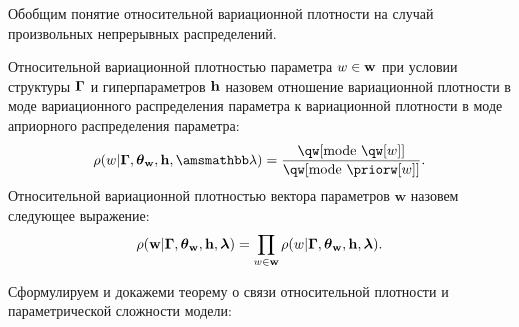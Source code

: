 Обобщим понятие относительной вариационной плотности на случай произвольных непрерывных распределений.
\begin{defin}
Относительной вариационной   плотностью параметра $w \in \mathbf{w}$  при условии структуры $\boldsymbol{\Gamma}$ и гиперпараметров $\mathbf{h}$ назовем отношение вариационной плотности в моде вариационного распределения параметра к вариационной плотности в моде априорного распределения параметра:
\[
\rho(w|\G,\tetaw, \h,\Lamb)=\frac{\qw[\text{mode}~\qw[w]]}{\qw[\text{mode}~\priorw[w]]}.
\]
Относительной вариационной плотностью вектора параметров $\mathbf{w}$ назовем следующее выражение:
\[
    {\rho}(\mathbf{w}|\boldsymbol{\Gamma}, \boldsymbol{\theta}_\mathbf{w}, \mathbf{h},\boldsymbol{\lambda}) = \prod_{w \in \mathbf{w}}\rho(w|\boldsymbol{\Gamma},\boldsymbol{\theta}_\mathbf{w},\mathbf{h},\boldsymbol{\lambda}).
\]

\end{defin}

Сформулируем и докажеми теорему о связи относительной плотности и параметрической сложности модели:

